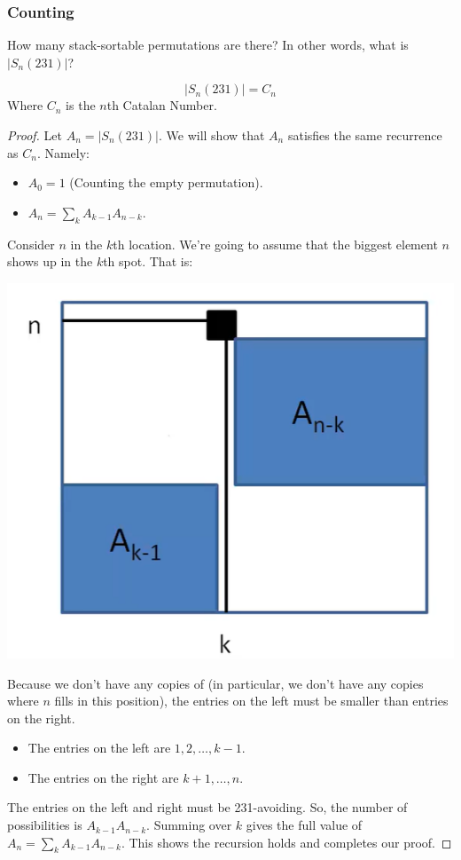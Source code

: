 \documentclass[letterpaper]{article}
\begin{document}
\subsubsection{Counting}
How many stack-sortable permutations are there? In other words, what is $|S_{n}(231)|$? 
\begin{theorem}{}{}
    \[|S_{n}(231)| = C_n\]
    Where $C_n$ is the $n$th Catalan Number.
\end{theorem}
\begin{proof}
    Let $A_{n} = |S_{n}(231)|$. We will show that $A_n$ satisfies the same recurrence as $C_n$. Namely:
    \begin{itemize}
        \item $A_0 = 1$ (Counting the empty permutation).
        \item $A_n = \sum_{k} A_{k - 1} A_{n - k}$. 
    \end{itemize}
    Consider $n$ in the $k$th location. We're going to assume that the biggest element $n$ shows up in the $k$th spot. That is:
    \begin{center}
        \includegraphics[scale=0.3]{img/layout_perm.PNG}
    \end{center}
    Because we don't have any copies of  (in particular, we don't have any copies where $n$ fills in this  position), the entries on the left must be smaller than entries on the right.
    \begin{itemize}
        \item The entries on the left are $1, 2, \dots, k - 1$.
        \item The entries on the right are $k + 1, \dots, n$. 
    \end{itemize} 
    The entries on the left and right must be 231-avoiding. So, the number of possibilities is $A_{k - 1}A_{n - k}$. Summing over $k$ gives the full value of $A_n = \sum_{k} A_{k - 1}A_{n - k}$. This shows the recursion holds and completes our proof.  
\end{proof}
\end{document}
